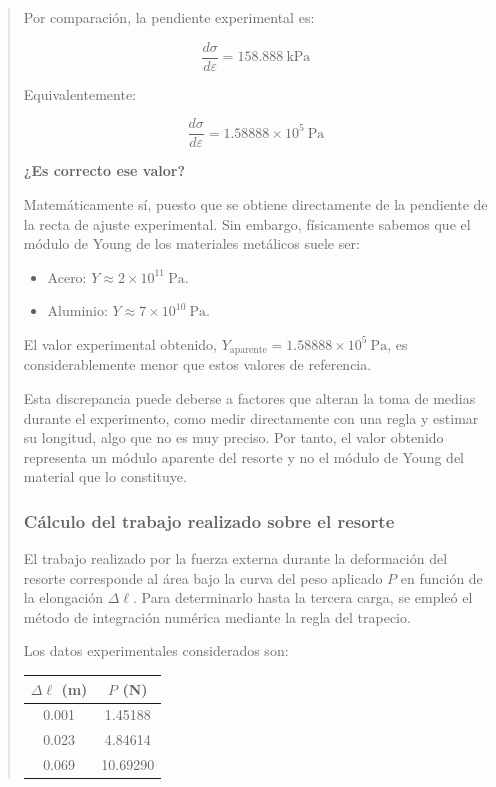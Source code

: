\documentclass[11pt,a4paper]{article}
\begin{document}
\begin{quote}
Por comparación, la pendiente experimental es:

\begin{equation}
    \frac{d\sigma}{d\varepsilon}
    = 158.888\ \mathrm{kPa}
\end{equation}

Equivalentemente:

\begin{equation}
    \boxed{
    \frac{d\sigma}{d\varepsilon}
    = 1.58888\times10^{5}\ \mathrm{Pa}
    }
\end{equation}


\noindent\textbf{¿Es correcto ese valor?}

Matemáticamente sí, puesto que se obtiene directamente
de la pendiente de la recta de ajuste experimental.
Sin embargo, físicamente sabemos que el módulo de Young
de los materiales metálicos suele ser:

\begin{itemize}
    \item Acero: $Y \approx 2\times10^{11}\ \mathrm{Pa}$.
    \item Aluminio: $Y \approx 7\times10^{10}\ \mathrm{Pa}$.
\end{itemize}

El valor experimental obtenido,
$Y_{\mathrm{aparente}}=1.58888\times10^{5}\ \mathrm{Pa}$,
es considerablemente menor que estos valores de referencia.

Esta discrepancia puede deberse a factores que alteran la toma de medias durante el experimento, como medir directamente con una regla y estimar su longitud, algo que no es muy preciso.
Por tanto, el valor obtenido representa un módulo
aparente del resorte y no el módulo de Young
del material que lo constituye.


\subsubsection{Cálculo del trabajo realizado sobre el resorte}

El trabajo realizado por la fuerza externa durante la
deformación del resorte corresponde al área bajo la
curva del peso aplicado $P$ en función de la elongación
$\Delta\ell$. Para determinarlo hasta la tercera carga,
se empleó el método de integración numérica mediante
la regla del trapecio.

Los datos experimentales considerados son:

\begin{center}
\begin{tabular}{c c}
\hline
$\Delta\ell$ (m) & $P$ (N) \\
\hline
0.001 & 1.45188 \\
0.023 & 4.84614 \\
0.069 & 10.69290 \\
\hline
\end{tabular}
\end{center}


\end{quote}
\end{document}
